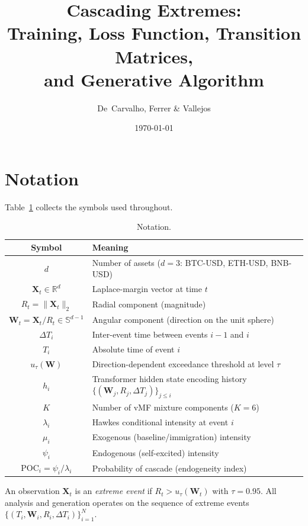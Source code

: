 \documentclass[11pt,a4paper]{article}
\title{Cascading Extremes:\\Training, Loss Function, Transition Matrices,\\
       and Generative Algorithm}
\author{De~Carvalho, Ferrer \& Vallejos}
\date{\today}
\newcommand{\bW}{\boldsymbol{W}}
\newcommand{\bX}{\boldsymbol{X}}
\newcommand{\R}{\mathbb{R}}
\begin{document}
\maketitle

\section{Notation}\label{sec:notation}

Table~\ref{tab:notation} collects the symbols used throughout.

\begin{table}[h]
\centering
\caption{Notation.}\label{tab:notation}
\begin{tabular}{@{}cl@{}}
\toprule
\textbf{Symbol} & \textbf{Meaning} \\
\midrule
$d$          & Number of assets ($d=3$: BTC-USD, ETH-USD, BNB-USD) \\
$\bX_t \in \R^d$  & Laplace-margin vector at time $t$ \\
$R_t = \|\bX_t\|_2$  & Radial component (magnitude) \\
$\bW_t = \bX_t / R_t \in \mathbb{S}^{d-1}$  & Angular component (direction on the unit sphere) \\
$\Delta T_i$  & Inter-event time between events $i{-}1$ and $i$ \\
$T_i$         & Absolute time of event $i$ \\
$u_\tau(\bW)$ & Direction-dependent exceedance threshold at level $\tau$ \\
$h_i$         & Transformer hidden state encoding history $\{(\bW_j, R_j, \Delta T_j)\}_{j \le i}$ \\
$K$           & Number of vMF mixture components ($K=6$) \\
$\lambda_i$   & Hawkes conditional intensity at event $i$ \\
$\mu_i$       & Exogenous (baseline/immigration) intensity \\
$\psi_i$      & Endogenous (self-excited) intensity \\
$\text{POC}_i = \psi_i/\lambda_i$ & Probability of cascade (endogeneity index) \\
\bottomrule
\end{tabular}
\end{table}

An observation $\bX_t$ is an \emph{extreme event} if
$R_t > u_\tau(\bW_t)$ with $\tau = 0.95$.
All analysis and generation operates on the sequence of extreme events
$\{(T_i, \bW_i, R_i, \Delta T_i)\}_{i=1}^N$.
\end{document}
